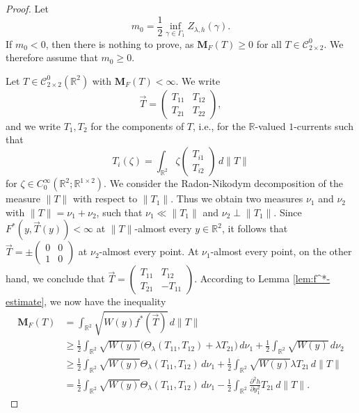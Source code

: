 \documentclass[a4paper]{article}
\newcommand{\R}{\mathbb{R}}
\newcommand{\M}{\mathbf{M}}
\newcommand{\ncrt}{\mathcal{C}}
\theoremstyle{definition}
\theoremstyle{remark}
\begin{document}
\begin{proof}
Let
\[
m_0 = \frac{1}{2} \inf_{\gamma \in \Gamma_1} Z_{\lambda, h}(\gamma).
\]
If $m_0 < 0$, then there is nothing to prove, as $\M_F(T) \ge 0$ for all $T \in \ncrt_{2 \times 2}^0$.
We therefore assume that $m_0 \ge 0$.

Let $T \in \ncrt_{2 \times 2}^0(\R^2)$ with $\M_F(T) < \infty$.
We write
\[
\vec{T} = \begin{pmatrix} T_{11} & T_{12} \\ T_{21} & T_{22} \end{pmatrix},
\]
and we write $T_1, T_2$ for the components of $T$, i.e., for the
$\R$-valued $1$-currents such that
\[
T_i(\zeta) = \int_{\R^2} \zeta \begin{pmatrix} T_{i1} \\ T_{i2} \end{pmatrix} \, d\|T\|
\]
for $\zeta \in C_0^\infty(\R^2; \R^{1 \times 2})$. We consider the
Radon-Nikodym decomposition of the measure $\|T\|$ with respect to
$\|T_1\|$. Thus we obtain two measures $\nu_1$ and $\nu_2$ with
$\|T\| = \nu_1 + \nu_2$, such that $\nu_1 \ll \|T_1\|$ and $\nu_2 \perp \|T_1\|$.
Since $F^*(y, \vec{T}(y)) < \infty$ at $\|T\|$-almost every $y \in \R^2$,
it follows that
$\vec{T} = \pm (\begin{smallmatrix} 0 & 0 \\ 1 & 0 \end{smallmatrix})$
at $\nu_2$-almost every point. At $\nu_1$-almost every point, on the
other hand, we conclude that
$\vec{T} = (\begin{smallmatrix} T_{11} & T_{12} \\ T_{21} & -T_{11} \end{smallmatrix})$.
According to Lemma \ref{lem:f^*-estimate}, we now have the inequality
\begin{equation} \label{eq:M_F-first-estimate}
\begin{split}
\M_F(T) & = \int_{\R^2} \sqrt{W(y) f^*(\vec{T})} \, d\|T\| \\
& \ge \frac{1}{2} \int_{\R^2} \sqrt{W(y)} \bigl(\Theta_\lambda(T_{11}, T_{12}) + \lambda T_{21} \bigr) \, d\nu_1 + \frac{1}{2} \int_{\R^2} \sqrt{W(y)} \, d\nu_2 \\
& \ge \frac{1}{2} \int_{\R^2} \sqrt{W(y)} \Theta_\lambda(T_{11}, T_{12}) \, d\nu_1 + \frac{1}{2} \int_{\R^2} \sqrt{W(y)} \lambda T_{21} \, d\|T\| \\
& = \frac{1}{2} \int_{\R^2} \sqrt{W(y)} \Theta_\lambda(T_{11}, T_{12}) \, d\nu_1 - \frac{1}{2} \int_{\R^2}  \frac{\partial^2 h}{\partial y_1^2} T_{21} \, d\|T\|.
\end{split}
\end{equation}


\end{proof}
\end{document}
